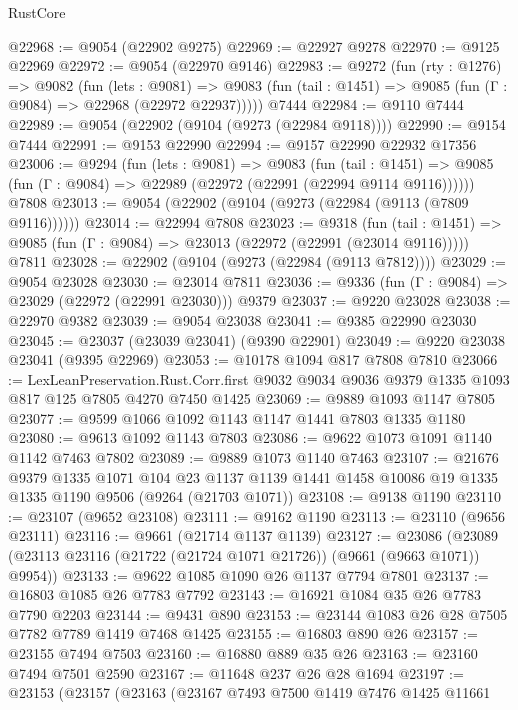 \begin{lexlean}{RustCore}
\begin{coremodule}
@22968 := @9054 (@22902 @9275)
@22969 := @22927 @9278
@22970 := @9125 @22969
@22972 := @9054 (@22970 @9146)
@22983 := @9272
    (fun (rty : @1276) =>
    @9082
      (fun (lets : @9081) =>
      @9083 (fun (tail : @1451) => @9085 (fun (Γ : @9084) => @22968 (@22972 @22937)))))
    @7444
@22984 := @9110 @7444
@22989 := @9054 (@22902 (@9104 (@9273 (@22984 @9118))))
@22990 := @9154 @7444
@22991 := @9153 @22990
@22994 := @9157 @22990 @22932 @17356
@23006 := @9294
    (fun (lets : @9081) =>
    @9083
      (fun (tail : @1451) =>
      @9085 (fun (Γ : @9084) => @22989 (@22972 (@22991 (@22994 @9114 @9116))))))
    @7808
@23013 := @9054 (@22902 (@9104 (@9273 (@22984 (@9113 (@7809 @9116))))))
@23014 := @22994 @7808
@23023 := @9318
    (fun (tail : @1451) => @9085 (fun (Γ : @9084) => @23013 (@22972 (@22991 (@23014 @9116)))))
    @7811
@23028 := @22902 (@9104 (@9273 (@22984 (@9113 @7812))))
@23029 := @9054 @23028
@23030 := @23014 @7811
@23036 := @9336 (fun (Γ : @9084) => @23029 (@22972 (@22991 @23030))) @9379
@23037 := @9220 @23028
@23038 := @22970 @9382
@23039 := @9054 @23038
@23041 := @9385 @22990 @23030
@23045 := @23037 (@23039 @23041) (@9390 @22901)
@23049 := @9220 @23038 @23041 (@9395 @22969)
@23053 := @10178 @1094 @817 @7808 @7810
@23066 := LexLeanPreservation.Rust.Corr.first
    @9032
    @9034
    @9036
    @9379
    @1335
    @1093
    @817
    @125
    @7805
    @4270
    @7450
    @1425
@23069 := @9889 @1093 @1147 @7805
@23077 := @9599 @1066 @1092 @1143 @1147 @1441 @7803 @1335 @1180
@23080 := @9613 @1092 @1143 @7803
@23086 := @9622 @1073 @1091 @1140 @1142 @7463 @7802
@23089 := @9889 @1073 @1140 @7463
@23107 := @21676
    @9379
    @1335
    @1071
    @104
    @23
    @1137
    @1139
    @1441
    @1458
    @10086
    @19
    @1335
    @1335
    @1190
    @9506
    (@9264 (@21703 @1071))
@23108 := @9138 @1190
@23110 := @23107 (@9652 @23108)
@23111 := @9162 @1190
@23113 := @23110 (@9656 @23111)
@23116 := @9661 (@21714 @1137 @1139)
@23127 := @23086 (@23089 (@23113 @23116 (@21722 (@21724 @1071 @21726)) (@9661 (@9663 @1071)) @9954))
@23133 := @9622 @1085 @1090 @26 @1137 @7794 @7801
@23137 := @16803 @1085 @26 @7783 @7792
@23143 := @16921 @1084 @35 @26 @7783 @7790 @2203
@23144 := @9431 @890
@23153 := @23144 @1083 @26 @28 @7505 @7782 @7789 @1419 @7468 @1425
@23155 := @16803 @890 @26
@23157 := @23155 @7494 @7503
@23160 := @16880 @889 @35 @26
@23163 := @23160 @7494 @7501 @2590
@23167 := @11648 @237 @26 @28 @1694
@23197 := @23153
    (@23157
      (@23163
        (@23167
          @7493
          @7500
          @1419
          @7476
          @1425
          @11661

\end{coremodule}
\end{lexlean}

